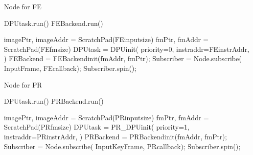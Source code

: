 \begin{algorithm}[h]
    \caption{ Node for FE }
    \begin{algorithmic}[1]
        \State DPUtask.run()
        \State FEBackend.run()
        \EndFunction

        \State imagePtr, imageAddr = ScratchPad(FEinputsize)
        \State fmPtr, fmAddr = ScratchPad(FEfmsize)
        \State DPUtask = DPUinit({\color{red}  priority=0},{\color{blue} instraddr=FEinstrAddr, }
        \State \qquad \qquad \qquad {} ) 
        \State FEBackend = FEBackendinit({\color{blue}fmAddr, fmPtr});
        \State Subscriber = Node.subscribe( InputFrame, FEcallback);
        \State Subscriber.spin();
        \EndFunction
    \end{algorithmic}
\end{algorithm}

\begin{algorithm}[h]
    \caption{ Node for PR }
    \begin{algorithmic}[1]
        \State DPUtask.run()
        \State PRBackend.run()
        \EndFunction

        \State imagePtr, imageAddr = ScratchPad(PRinputsize)
        \State fmPtr, fmAddr = ScratchPad(PRfmsize)
        \State DPUtask = PR\_DPUinit( {\color{red} priority=1},{\color{blue} instraddr=PRinstrAddr}, 
        \State \qquad \qquad \qquad {} ) 
        \State PRBackend = PRBackendinit({\color{blue}fmAddr, fmPtr});
        \State Subscriber = Node.subscribe( InputKeyFrame, PRcallback);
        \State Subscriber.spin();
        \EndFunction
    \end{algorithmic}
\end{algorithm}



